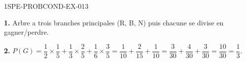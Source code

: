 \begin{corrige}{1SPE-PROBCOND-EX-013}

\textbf{1.} Arbre a trois branches principales (R, B, N) puis chacune se divise en gagner/perdre.

\medskip
\textbf{2.} $P(G) = \dfrac{1}{2} \times \dfrac{1}{5} + \dfrac{1}{3} \times \dfrac{2}{5} + \dfrac{1}{6} \times \dfrac{3}{5} = \dfrac{1}{10} + \dfrac{2}{15} + \dfrac{1}{10} = \dfrac{3}{30} + \dfrac{4}{30} + \dfrac{3}{30} = \dfrac{10}{30} = \dfrac{1}{3}$.

\end{corrige}
